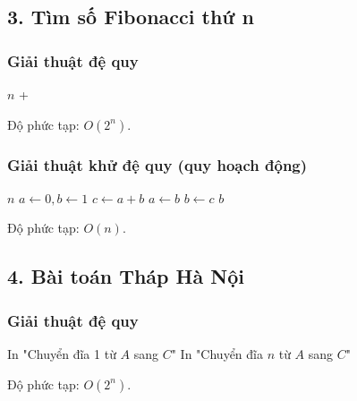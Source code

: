 \documentclass{article}
\begin{document}
\subsection*{3. Tìm số Fibonacci thứ n}

\subsubsection*{Giải thuật đệ quy}
\begin{algorithm}[H]
\caption{Fibonacci đệ quy}
\begin{algorithmic}
     \RETURN $n$
    \ELSE \RETURN {} + 
    \ENDIF
\ENDPROCEDURE
\end{algorithmic}
\end{algorithm}
Độ phức tạp: $O(2^n)$.

\subsubsection*{Giải thuật khử đệ quy (quy hoạch động)}
\begin{algorithm}[H]
\caption{Fibonacci khử đệ quy}
\begin{algorithmic}
     \RETURN $n$
    \ENDIF
    \STATE $a \leftarrow 0, b \leftarrow 1$
        \STATE $c \leftarrow a + b$
        \STATE $a \leftarrow b$
        \STATE $b \leftarrow c$
    \ENDFOR
    \RETURN $b$
\ENDPROCEDURE
\end{algorithmic}
\end{algorithm}
Độ phức tạp: $O(n)$.

\subsection*{4. Bài toán Tháp Hà Nội}

\subsubsection*{Giải thuật đệ quy}
\begin{algorithm}[H]
\caption{Tháp Hà Nội đệ quy}
\begin{algorithmic}
        \STATE In "Chuyển đĩa 1 từ $A$ sang $C$"
    \ELSE
        \STATE {}
        \STATE In "Chuyển đĩa $n$ từ $A$ sang $C$"
        \STATE {}
    \ENDIF
\ENDPROCEDURE
\end{algorithmic}
\end{algorithm}
Độ phức tạp: $O(2^n)$.
\end{document}
